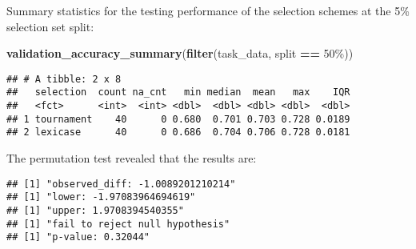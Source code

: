 \documentclass[
]{book}
\newenvironment{Shaded}{\begin{snugshade}}{\end{snugshade}}
\newcommand{\AttributeTok}[1]{\textcolor[rgb]{0.13,0.29,0.53}{#1}}
\newcommand{\DecValTok}[1]{\textcolor[rgb]{0.00,0.00,0.81}{#1}}
\newcommand{\FunctionTok}[1]{\textcolor[rgb]{0.13,0.29,0.53}{\textbf{#1}}}
\newcommand{\NormalTok}[1]{#1}
\newcommand{\OtherTok}[1]{\textcolor[rgb]{0.56,0.35,0.01}{#1}}
\newcommand{\SpecialCharTok}[1]{\textcolor[rgb]{0.81,0.36,0.00}{\textbf{#1}}}
\newcommand{\StringTok}[1]{\textcolor[rgb]{0.31,0.60,0.02}{#1}}
\begin{document}
Summary statistics for the testing performance of the selection schemes at the 5\% selection set split:

\begin{Shaded}
\begin{Highlighting}[]
\FunctionTok{validation\_accuracy\_summary}\NormalTok{(}\FunctionTok{filter}\NormalTok{(task\_data, split }\SpecialCharTok{==} \StringTok{\textquotesingle{}50\%\textquotesingle{}}\NormalTok{))}
\end{Highlighting}
\end{Shaded}

\begin{verbatim}
## # A tibble: 2 x 8
##   selection  count na_cnt   min median  mean   max    IQR
##   <fct>      <int>  <int> <dbl>  <dbl> <dbl> <dbl>  <dbl>
## 1 tournament    40      0 0.680  0.701 0.703 0.728 0.0189
## 2 lexicase      40      0 0.686  0.704 0.706 0.728 0.0181
\end{verbatim}

The permutation test revealed that the results are:

\begin{Shaded}
\end{Shaded}

\begin{verbatim}
## [1] "observed_diff: -1.0089201210214"
## [1] "lower: -1.97083964694619"
## [1] "upper: 1.9708394540355"
## [1] "fail to reject null hypothesis"
## [1] "p-value: 0.32044"
\end{verbatim}
\end{document}
